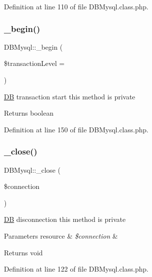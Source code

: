 Definition at line 110 of file D\+B\+Mysql.\+class.\+php.

\mbox{\label{classDBMysql_a60dec65d2138fed25d0331e498972df8}} 
\subsubsection{\texorpdfstring{\+\_\+begin()}{\_begin()}}
{\footnotesize\ttfamily D\+B\+Mysql\+::\+\_\+begin (\begin{DoxyParamCaption}\item[{}]{\$transaction\+Level = {} }\end{DoxyParamCaption})}

\hyperlink{classDB}{DB} transaction start this method is private \begin{DoxyReturn}{Returns}
boolean 
\end{DoxyReturn}


Definition at line 150 of file D\+B\+Mysql.\+class.\+php.

\mbox{\label{classDBMysql_a59581237e4dcb5f91f63de2459248e13}} 
\subsubsection{\texorpdfstring{\+\_\+close()}{\_close()}}
{\footnotesize\ttfamily D\+B\+Mysql\+::\+\_\+close (\begin{DoxyParamCaption}\item[{}]{\$connection }\end{DoxyParamCaption})}

\hyperlink{classDB}{DB} disconnection this method is private 
\begin{DoxyParams}[1]{Parameters}
resource & {\em \$connection} & \\
\hline
\end{DoxyParams}
\begin{DoxyReturn}{Returns}
void 
\end{DoxyReturn}


Definition at line 122 of file D\+B\+Mysql.\+class.\+php.

\mbox{\label{classDBMysql_a3f720677af37c36b2bc2934dd358a477}} 
